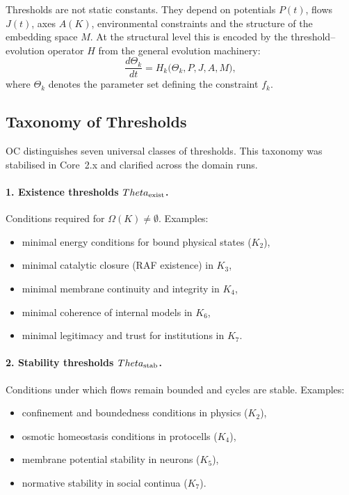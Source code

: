 Thresholds are not static constants.
They depend on potentials \(P(t)\), flows \(J(t)\), axes \(A(K)\), environmental
constraints and the structure of the embedding space \(M\).
At the structural level this is encoded by the threshold–evolution operator
\(H\) from the general evolution machinery:
\[
  \frac{d\Theta_k}{dt}
   = H_k\big(\Theta_k, P, J, A, M\big),
\]
where \(\Theta_k\) denotes the parameter set defining the constraint \(f_k\).

\subsection{Taxonomy of Thresholds}

OC distinguishes seven universal classes of thresholds. This taxonomy was
stabilised in Core~2.x and clarified across the domain runs.

\paragraph{1. Existence thresholds \(\Theta_{\rm exist}\).}
Conditions required for \(\Omega(K)\neq\emptyset\).
Examples:
\begin{itemize}
    \item minimal energy conditions for bound physical states (\(K_2\)),
    \item minimal catalytic closure (RAF existence) in \(K_3\),
    \item minimal membrane continuity and integrity in \(K_4\),
    \item minimal coherence of internal models in \(K_6\),
    \item minimal legitimacy and trust for institutions in \(K_7\).
\end{itemize}

\paragraph{2. Stability thresholds \(\Theta_{\rm stab}\).}
Conditions under which flows remain bounded and cycles are stable.
Examples:
\begin{itemize}
    \item confinement and boundedness conditions in physics (\(K_2\)),
    \item osmotic homeostasis conditions in protocells (\(K_4\)),
    \item membrane potential stability in neurons (\(K_5\)),
    \item normative stability in social continua (\(K_7\)).
\end{itemize}

